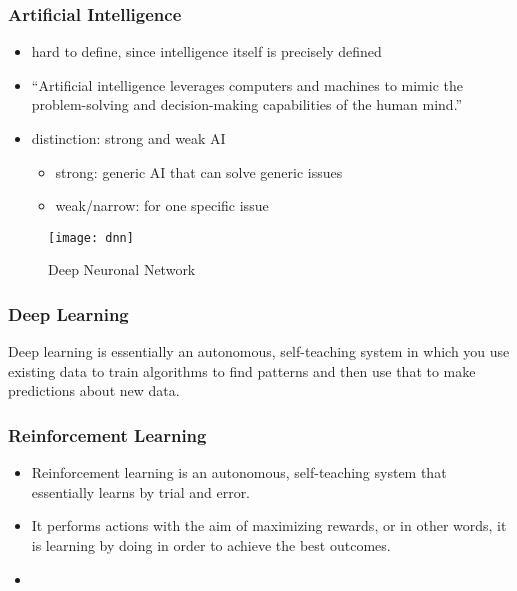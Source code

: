 \begin{frame}
    \frametitle{Artificial Intelligence}

    \begin{itemize}
        \item hard to define, since intelligence itself is precisely defined
        \item ``Artificial intelligence leverages computers and machines to mimic the problem-solving and decision-making capabilities of the human mind.''
        \item distinction: strong and weak AI
        \begin{itemize}
                  \item strong: generic AI that can solve generic issues
                  \item weak/narrow: for one specific issue
        \end{itemize}
    \end{itemize}

    \begin{figure}
        \texttt{[image: dnn]}
        \caption{Deep Neuronal Network}
        \label{fig:dnn}
    \end{figure}
\end{frame}

\begin{frame}
    \frametitle{Deep Learning}

    Deep learning is essentially an autonomous, self-teaching system in which you use existing data to train algorithms
    to find patterns and then use that to make predictions about new data.
\end{frame}

\begin{frame}
    \frametitle{Reinforcement Learning}

    \begin{itemize}
        \item Reinforcement learning is an autonomous, self-teaching system that essentially learns by trial and error.
        \item It performs actions with the aim of maximizing rewards, or in other words, it is learning by doing in order to achieve the best outcomes.
        \item
    \end{itemize}
\end{frame}

